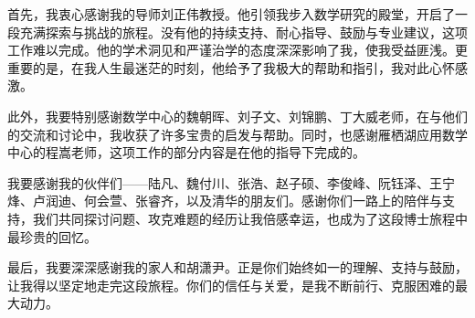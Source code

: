 
\begin{acknowledgements}
  首先，我衷心感谢我的导师刘正伟教授。他引领我步入数学研究的殿堂，开启了一段充满探索与挑战的旅程。没有他的持续支持、耐心指导、鼓励与专业建议，这项工作难以完成。他的学术洞见和严谨治学的态度深深影响了我，使我受益匪浅。更重要的是，在我人生最迷茫的时刻，他给予了我极大的帮助和指引，我对此心怀感激。

此外，我要特别感谢数学中心的魏朝晖、刘子文、刘锦鹏、丁大威老师，在与他们的交流和讨论中，我收获了许多宝贵的启发与帮助。同时，也感谢雁栖湖应用数学中心的程嵩老师，这项工作的部分内容是在他的指导下完成的。

我要感谢我的伙伴们——陆凡、魏付川、张浩、赵子硕、李俊峰、阮钰泽、王宁烽、卢润迪、何会萱、张睿齐，以及清华的朋友们。感谢你们一路上的陪伴与支持，我们共同探讨问题、攻克难题的经历让我倍感幸运，也成为了这段博士旅程中最珍贵的回忆。

最后，我要深深感谢我的家人和胡潇尹。正是你们始终如一的理解、支持与鼓励，让我得以坚定地走完这段旅程。你们的信任与关爱，是我不断前行、克服困难的最大动力。
\end{acknowledgements}
